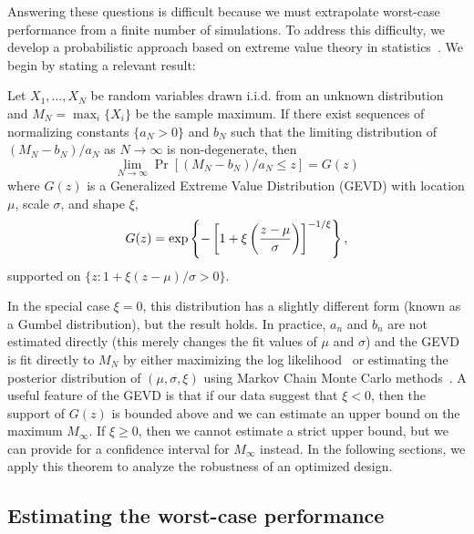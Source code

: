 Answering these questions is difficult because we must extrapolate worst-case performance from a finite number of simulations. To address this difficulty, we develop a probabilistic approach based on extreme value theory in statistics~\cite{sridhar2021improving,wood_zhang_1996,coles_2001}. We begin by stating a relevant result:

\begin{theorem}\label{ch:rss:extreme_value_thm}
	Let $X_1, \ldots, X_N$ be random variables drawn i.i.d. from an unknown distribution and $M_N = \max_i \{ X_i \}$ be the sample maximum. If there exist sequences of normalizing constants $\{a_N > 0\}$ and $b_N$ such that the limiting distribution of $(M_N - b_N)/a_N$ as $N\to\infty$ is non-degenerate, then
	\begin{equation}
		\lim_{N\to\infty} \Pr\left[(M_N - b_N) / a_N \leq z \right] = G(z)
	\end{equation}
	where $G(z)$ is a Generalized Extreme Value Distribution (GEVD) with location $\mu$, scale $\sigma$, and shape $\xi$,
	\begin{equation}
		G(z) = \exp \left\{ -\left[ 1 + \xi\left( \frac{z - \mu}{\sigma} \right) \right]^{-1/\xi} \right\},
	\end{equation}
	supported on $\{z : 1 + \xi(z - \mu)/\sigma > 0\}$.
\end{theorem}

In the special case $\xi = 0$, this distribution has a slightly different form (known as a Gumbel distribution), but the result holds. In practice, $a_n$ and $b_n$ are not estimated directly (this merely changes the fit values of $\mu$ and $\sigma$) and the GEVD is fit directly to $M_N$ by either maximizing the log likelihood~\cite{coles_2001} or estimating the posterior distribution of $(\mu, \sigma, \xi)$ using Markov Chain Monte Carlo methods~\cite{salvatier_wiecki_fonnesbeck_2016}. A useful feature of the GEVD is that if our data suggest that $\xi < 0$, then the support of $G(z)$ is bounded above and we can estimate an upper bound on the maximum $M_\infty$. If $\xi \geq 0$, then we cannot estimate a strict upper bound, but we can provide for a confidence interval for $M_\infty$ instead. In the following sections, we apply this theorem to analyze the robustness of an optimized design.

\subsection{Estimating the worst-case performance}

